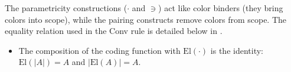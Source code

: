 \documentclass[english]{PaperTools/latex/lipics}
\def\fresh#1{\mathsf{fresh}(#1)}
\def\El#1{\mathrm{El}(#1)}
\begin{document}
The parametricity constructions ($·$ and $∋$) act like color
binders (they bring colors into scope), while the pairing constructs
remove colors from scope.
The equality relation used in the {\sc Conv} rule is detailed below in .

\begin{itemize}
\item The composition of the coding function with $\El{·}$ is the
    identity: $\El{|A|} = A$ and $|\El{A}| = A$.
\end{itemize}

\begin{definition}[$I$-term]
\end{definition}
\begin{definition}[$\fresh I$]
\end{definition}
\end{document}
